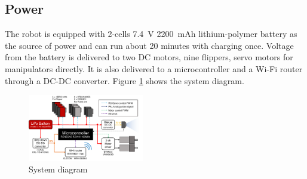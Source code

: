 \documentclass[journal]{IEEEtran}
\begin{document}

\subsection{Power}
The robot is equipped with 2-cells \SI{7.4}{\V} \SI{2200}{mAh} lithium-polymer battery as the source of power and can run about 20 minutes with charging once.
Voltage from the battery is delivered to two DC motors, nine flippers, servo motors for manipulators directly.
It is also delivered to a microcontroller and a Wi-Fi router through a DC-DC converter.
Figure \ref{fig:system} shows the system diagram.
\begin{figure}[!t]
    \centering
    \includegraphics[width=0.45\textwidth]{System_diagram.pdf}
    \caption{System diagram} \label{fig:system}
\end{figure}
\end{document}
